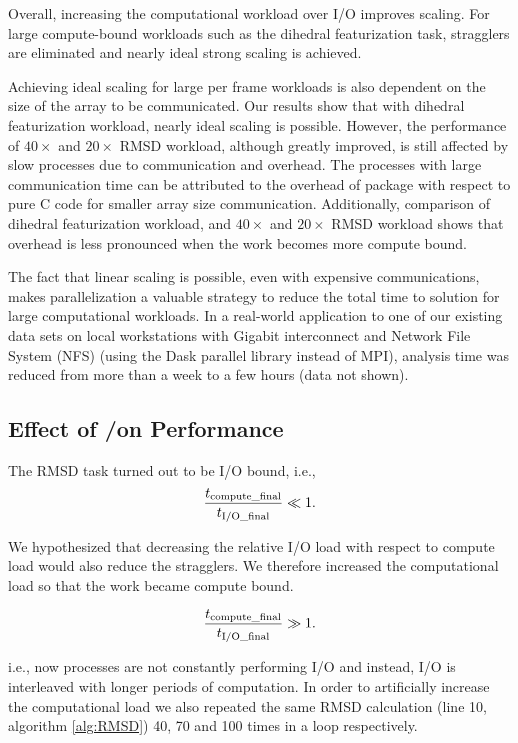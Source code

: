 Overall, increasing the computational workload over I/O improves scaling. For large compute-bound workloads such as the dihedral
featurization task, stragglers are eliminated and nearly ideal strong scaling is achieved. 

Achieving ideal scaling for large per frame workloads is also dependent on the size of the array to be communicated.  Our results
show that with dihedral featurization workload, nearly ideal scaling is possible. However, the performance of $40\times$ and $20\times$
RMSD workload, although greatly improved, is still affected by slow processes due to communication and overhead. The processes with large
communication time can be attributed to the overhead of  package with respect to pure C code for smaller array
size communication.  Additionally, comparison of dihedral featurization workload, and $40\times$ and $20\times$ RMSD workload
shows that overhead is less pronounced when the work becomes more compute bound.

The fact that linear scaling is possible, even with expensive communications, makes parallelization a valuable strategy to reduce
the total time to solution for large computational workloads. In a real-world application to one of our existing data sets on local
workstations with Gigabit interconnect and Network File System (NFS) (using the Dask parallel library instead of MPI), analysis time was reduced from more
than a week to a few hours (data not shown).

\subsection{Effect of \tcomp/\tIO on Performance}
\label{bound}

The RMSD task turned out to be I/O bound, i.e.,
\begin{gather*}
  \frac{{t}_{\text{compute\_final}}}{{t}_{\text{I/O\_final}}} \ll 1.
\end{gather*}

We hypothesized that decreasing the relative I/O load with respect to compute load would also reduce the stragglers. 
We therefore increased the computational load so that the work became compute bound.

\begin{gather*}
  \frac{{t}_{\text{compute\_final}}}{{t}_{\text{I/O\_final}}} \gg 1.
\end{gather*}

i.e., now processes are not constantly performing I/O and instead, I/O is interleaved with longer periods of computation.
In order to artificially increase the computational load we also repeated the same RMSD calculation (line 10, algorithm \ref{alg:RMSD}) 40, 70 and 100 times in a loop respectively.

